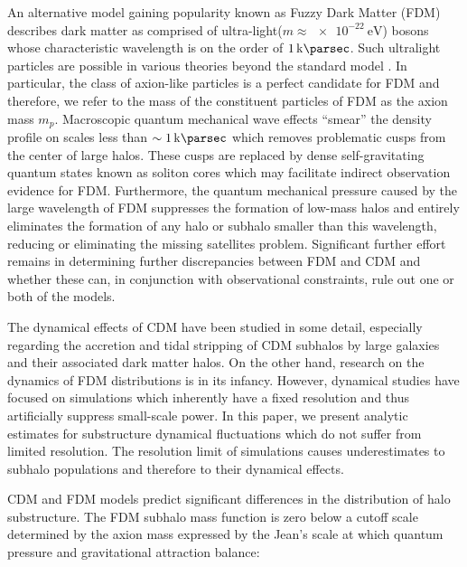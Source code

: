 \documentclass[usenatbib]{mnras}
\newcommand{\poweV}[1]{\SI{e#1}{\electronvolt}}
\begin{document}
\par
	An alternative model gaining popularity known as Fuzzy Dark Matter (FDM) describes dark matter as comprised of ultra-light($m \approx \poweV{-22}$) bosons whose characteristic wavelength is on the order of $\SI{1}{\kilo\parsec}$. Such ultralight particles are possible in various theories beyond the standard model \citep{axion_cosmology}. In particular, the class of axion-like particles is a perfect candidate for FDM and therefore, we refer to the mass of the constituent particles of FDM as the axion mass $m_p$. Macroscopic quantum mechanical wave effects “smear” the density profile on scales less than $\sim \SI{1}{\kilo\parsec}$ which removes problematic cusps from the center of large halos. These cusps are replaced by dense self-gravitating quantum states known as soliton cores which may facilitate indirect observation evidence for FDM. Furthermore, the quantum mechanical pressure caused by the large wavelength of FDM suppresses the formation of low-mass halos and entirely eliminates the formation of any halo or subhalo smaller than this wavelength, reducing or eliminating the missing satellites problem. Significant further effort remains in determining further discrepancies between FDM and CDM and whether these can, in conjunction with observational constraints, rule out one or both of the models.
 
\par
        The dynamical effects of CDM have been studied in some detail, especially regarding the accretion and tidal stripping of CDM subhalos by large galaxies and their associated dark matter halos. On the other hand, research on the dynamics of FDM distributions is in its infancy. However, dynamical studies have focused on simulations which inherently have a fixed resolution and thus artificially suppress small-scale power. In this paper, we present analytic estimates for substructure dynamical fluctuations which do not suffer from limited resolution. The resolution limit of simulations causes underestimates to subhalo populations and therefore to their dynamical effects. 
\par 
	CDM and FDM models predict significant differences in the distribution of halo substructure. The FDM subhalo mass function is zero below a cutoff scale determined by the axion mass expressed by the Jean’s scale at which quantum pressure and gravitational attraction balance:
\setlength{\belowdisplayskip}{4pt} \setlength{\belowdisplayshortskip}{4pt}
\setlength{\abovedisplayskip}{4pt} \setlength{\abovedisplayshortskip}{4pt}
\end{document}
